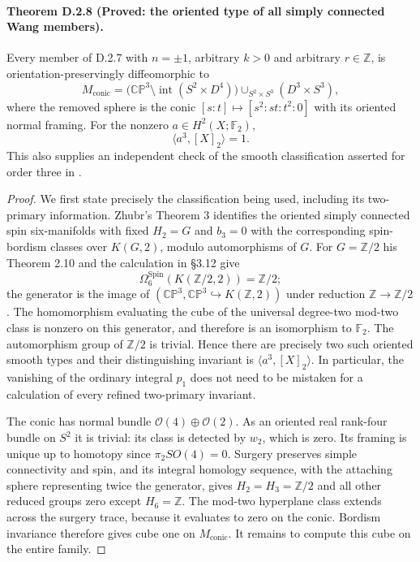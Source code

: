 \paragraph{Theorem D.2.8 (Proved: the oriented type of all simply connected Wang members).}
Every member of D.2.7 with $n=\pm1$, arbitrary $k>0$ and
arbitrary $r\in\mathbb Z$, is orientation-preservingly
diffeomorphic to
\[
 M_{\mathrm{conic}}=
 \bigl(\mathbb {CP}^3\setminus\operatorname{int}
       (S^2\times D^4)\bigr)
 \mathop{\cup}_{S^2\times S^3}(D^3\times S^3),
\]
where the removed sphere is the conic
$[s:t]\mapsto[s^2:st:t^2:0]$ with its oriented normal framing.
For the nonzero $a\in H^2(X;\mathbb F_2)$,
\[
 \langle a^3,[X]_2\rangle=1.
\]
This also supplies an independent check of the smooth
classification asserted for order three in
\cite[Theorem 7.1 and Appendix B]{manWang26}.
\begin{proof}
We first state precisely the classification being used, including
its two-primary information. Zhubr's Theorem 3 identifies the
oriented simply connected spin six-manifolds with fixed $H_2=G$
and $b_3=0$ with the corresponding spin-bordism classes over
$K(G,2)$, modulo automorphisms of $G$.
For $G=\mathbb Z/2$ his Theorem 2.10 and the calculation in
\S3.12 give
\[
 \Omega^{\mathrm{Spin}}_6(K(\mathbb Z/2,2))=\mathbb Z/2;
\]
the generator is the image of
$(\mathbb {CP}^3,\mathbb {CP}^3\hookrightarrow
K(\mathbb Z,2))$ under reduction $\mathbb Z\to\mathbb Z/2$
\cite[Theorems 3, 2.10, pp.795,803, and \S3.12, p.807]{manZhubr75}.
The homomorphism evaluating the cube of the universal
degree-two mod-two class is nonzero on this generator, and
therefore is an isomorphism to $\mathbb F_2$.
The automorphism group of $\mathbb Z/2$ is trivial. Hence there
are precisely two such oriented smooth types and their
distinguishing invariant is $\langle a^3,[X]_2\rangle$.
In particular, the vanishing of the ordinary integral $p_1$
does not need to be mistaken for a calculation of every refined
two-primary invariant.

The conic has normal bundle $\mathcal O(4)\oplus\mathcal O(2)$.
As an oriented real rank-four bundle on $S^2$ it is trivial:
its class is detected by $w_2$, which is zero. Its framing is
unique up to homotopy since $\pi_2SO(4)=0$.
Surgery preserves simple connectivity and spin, and its integral
homology sequence, with the attaching sphere representing twice
the generator, gives $H_2=H_3=\mathbb Z/2$ and all other reduced
groups zero except $H_6=\mathbb Z$.
The mod-two hyperplane class extends across the surgery trace,
because it evaluates to zero on the conic. Bordism invariance
therefore gives cube one on $M_{\mathrm{conic}}$.
It remains to compute this cube on the entire family.


\end{proof}

